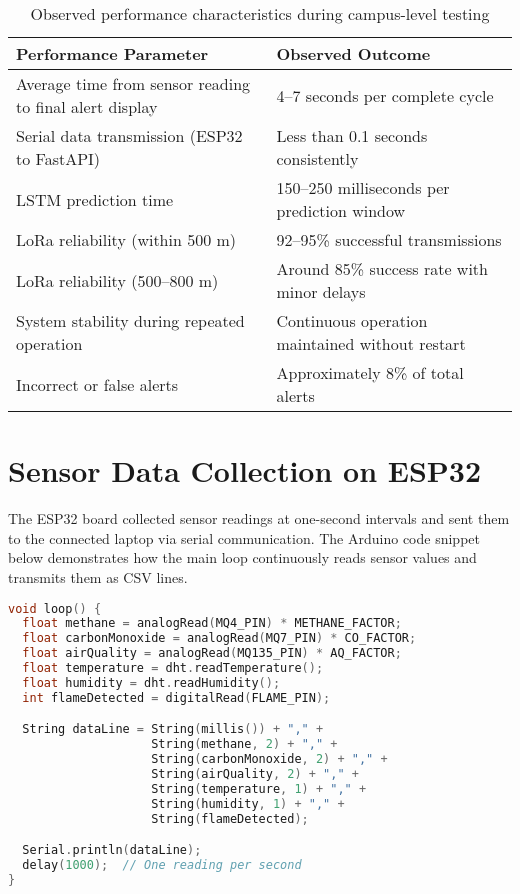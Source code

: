 \begin{table}[H]
\centering
\caption{Observed performance characteristics during campus-level testing}
\label{tab:performance}
\renewcommand{\arraystretch}{1.2}
\begin{tabular}{|p{7cm}|p{5cm}|}
\hline
\textbf{Performance Parameter} & \textbf{Observed Outcome} \\
\hline
Average time from sensor reading to final alert display & 4–7 seconds per complete cycle \\
\hline
Serial data transmission (ESP32 to FastAPI) & Less than 0.1 seconds consistently \\
\hline
LSTM prediction time & 150–250 milliseconds per prediction window \\
\hline
LoRa reliability (within 500 m) & 92–95\% successful transmissions \\
\hline
LoRa reliability (500–800 m) & Around 85\% success rate with minor delays \\
\hline
System stability during repeated operation & Continuous operation maintained without restart \\
\hline
Incorrect or false alerts & Approximately 8\% of total alerts \\
\hline
\end{tabular}
\end{table}

\section{Sensor Data Collection on ESP32}
The ESP32 board collected sensor readings at one-second intervals and sent them to the connected laptop via serial communication. The Arduino code snippet below demonstrates how the main loop continuously reads sensor values and transmits them as CSV lines.

\begin{lstlisting}[language=C, caption={Sensor reading and serial transmission on Heltec LoRa V3}]
void loop() {
  float methane = analogRead(MQ4_PIN) * METHANE_FACTOR;
  float carbonMonoxide = analogRead(MQ7_PIN) * CO_FACTOR;
  float airQuality = analogRead(MQ135_PIN) * AQ_FACTOR;
  float temperature = dht.readTemperature();
  float humidity = dht.readHumidity();
  int flameDetected = digitalRead(FLAME_PIN);

  String dataLine = String(millis()) + "," +
                    String(methane, 2) + "," +
                    String(carbonMonoxide, 2) + "," +
                    String(airQuality, 2) + "," +
                    String(temperature, 1) + "," +
                    String(humidity, 1) + "," +
                    String(flameDetected);

  Serial.println(dataLine);
  delay(1000);  // One reading per second
}
\end{lstlisting}

